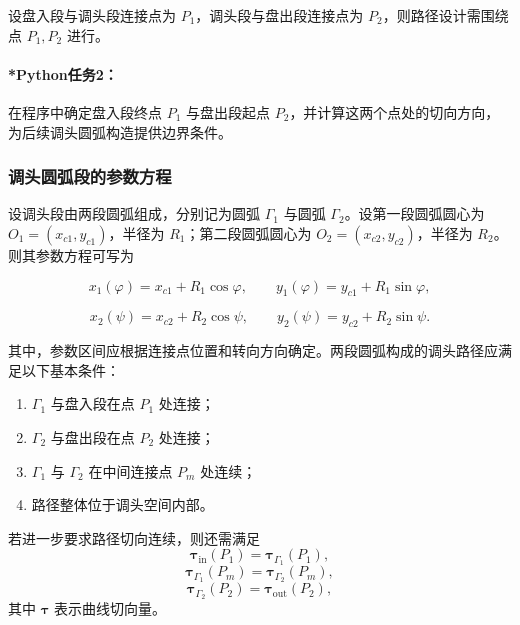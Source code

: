 \documentclass[12pt,a4paper]{ctexart}
\begin{document}
设盘入段与调头段连接点为 $P_1$，调头段与盘出段连接点为 $P_2$，则路径设计需围绕点 $P_1,P_2$ 进行。

\paragraph{*Python任务2：}
在程序中确定盘入段终点 $P_1$ 与盘出段起点 $P_2$，并计算这两个点处的切向方向，为后续调头圆弧构造提供边界条件。

\subsubsection{调头圆弧段的参数方程}
设调头段由两段圆弧组成，分别记为圆弧 $\Gamma_1$ 与圆弧 $\Gamma_2$。设第一段圆弧圆心为 $O_1=(x_{c1},y_{c1})$，半径为 $R_1$；第二段圆弧圆心为 $O_2=(x_{c2},y_{c2})$，半径为 $R_2$。则其参数方程可写为

\begin{equation}
x_1(\varphi)=x_{c1}+R_1\cos\varphi,\qquad
y_1(\varphi)=y_{c1}+R_1\sin\varphi,
\end{equation}

\begin{equation}
x_2(\psi)=x_{c2}+R_2\cos\psi,\qquad
y_2(\psi)=y_{c2}+R_2\sin\psi.
\end{equation}

其中，参数区间应根据连接点位置和转向方向确定。两段圆弧构成的调头路径应满足以下基本条件：

\begin{enumerate}
    \item $\Gamma_1$ 与盘入段在点 $P_1$ 处连接；
    \item $\Gamma_2$ 与盘出段在点 $P_2$ 处连接；
    \item $\Gamma_1$ 与 $\Gamma_2$ 在中间连接点 $P_m$ 处连续；
    \item 路径整体位于调头空间内部。
\end{enumerate}

若进一步要求路径切向连续，则还需满足
\begin{equation}
\bm{\tau}_{\mathrm{in}}(P_1)=\bm{\tau}_{\Gamma_1}(P_1),
\end{equation}
\begin{equation}
\bm{\tau}_{\Gamma_1}(P_m)=\bm{\tau}_{\Gamma_2}(P_m),
\end{equation}
\begin{equation}
\bm{\tau}_{\Gamma_2}(P_2)=\bm{\tau}_{\mathrm{out}}(P_2),
\end{equation}
其中 $\bm{\tau}$ 表示曲线切向量。
\end{document}
